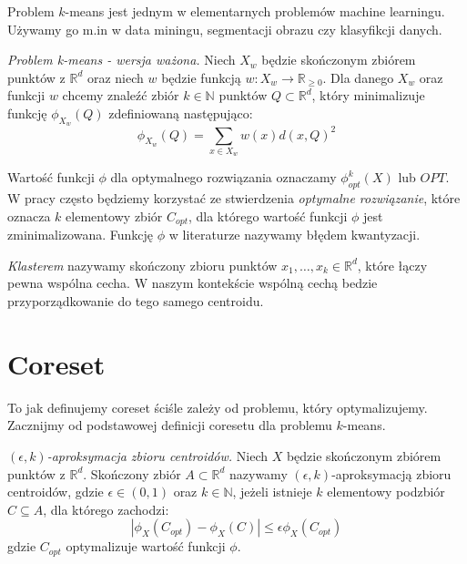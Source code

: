 \noindent
Problem $k$-means jest jednym w elementarnych problemów machine learningu.
Używamy go m.in w data miningu, segmentacji obrazu czy klasyfikcji danych. 

\begin{definition}
    \emph{Problem k-means - wersja ważona.} Niech $X_{w}$ będzie skończonym zbiórem punktów z $\mathbb{R}^{d}$ oraz niech $w$ będzie funkcją $w: X_{w} \rightarrow \mathbb{R}_{\ge0}$. 
    Dla danego $X_{w}$ oraz funkcji $w$ chcemy znaleźć zbiór $k \in \mathbb{N}$ punktów $Q \subset \mathbb{R}^{d}$, który minimalizuje funkcję $\phi_{X_{w}}(Q)$ zdefiniowaną następująco:
    \begin{equation}
        \phi_{X_{w}}(Q) = \sum_{x \in X_{w}} w(x) d(x, Q)^{2}
    \end{equation}
\end{definition}

\noindent
Wartość funkcji $\phi$ dla optymalnego rozwiązania oznaczamy $\phi_{opt}^{k}(X)$ lub $OPT$.
W pracy często będziemy korzystać ze stwierdzenia \textit{optymalne rozwiązanie}, które oznacza $k$ elementowy zbiór $C_{opt}$, dla którego wartość funkcji $\phi$ jest zminimalizowana. 
Funkcję $\phi$ w literaturze nazywamy błędem kwantyzacji.

\begin{definition}
    \emph{Klasterem} nazywamy skończony zbioru punktów $x_{1}, \dots, x_{k} \in \mathbb{R}^{d}$, które łączy pewna wspólna cecha.
    W naszym kontekście wspólną cechą bedzie przyporządkowanie do tego samego centroidu.
\end{definition}

\section{Coreset}

To jak definujemy coreset ściśle zależy od problemu, który optymalizujemy.
Zacznijmy od podstawowej definicji coresetu dla problemu $k$-means.

\begin{definition}
    \emph{$(\epsilon, k)$-aproksymacja zbioru centroidów.} 
    Niech $X$ będzie skończonym zbiórem punktów z $\mathbb{R}^{d}$.
    Skończony zbiór $A \subset \mathbb{R}^{d}$ nazywamy $(\epsilon, k)$-aproksymacją zbioru centroidów, gdzie $\epsilon \in (0, 1)$ oraz $k \in \mathbb{N}$, jeżeli istnieje $k$ elementowy podzbiór $C \subseteq A$, dla którego zachodzi:
    \begin{equation}
        |\phi_{X}(C_{opt}) - \phi_{X}(C)| \leq \epsilon\phi_{X}(C_{opt})
    \end{equation}
    gdzie $C_{opt}$ optymalizuje wartość funkcji $\phi$.
\end{definition}


